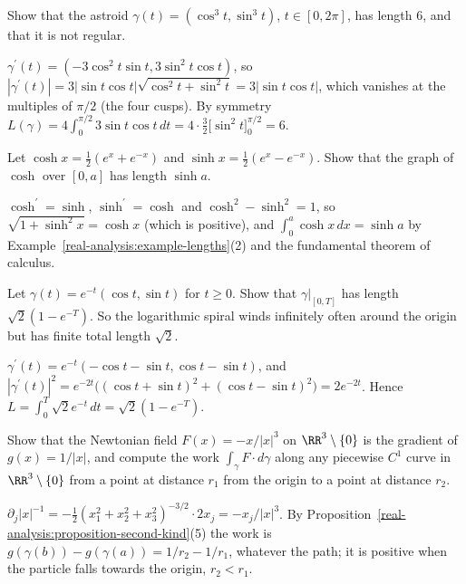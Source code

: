 \begin{exercise}\label{real-analysis:exercise-astroid}
Show that the astroid $\gamma(t) = (\cos^3t, \sin^3t)$, $t \in [0, 2\pi]$, has length $6$, and that it is not regular.
\end{exercise}

\begin{solution}
$\gamma^{\prime}(t) = (-3\cos^2t\sin t, 3\sin^2t\cos t)$, so $|\gamma^{\prime}(t)| = 3|\sin t\cos t|\sqrt{\cos^2t + \sin^2t} = 3|\sin t\cos t|$, which vanishes at the multiples of $\pi/2$ (the four cusps). By symmetry
$L(\gamma) = 4\int_0^{\pi/2}3\sin t\cos t\,dt = 4 \cdot \frac32\bigl[\sin^2t\bigr]_0^{\pi/2} = 6$.
\end{solution}

\begin{exercise}\label{real-analysis:exercise-catenary}
Let $\cosh x = \frac12(e^x + e^{-x})$ and $\sinh x = \frac12(e^x - e^{-x})$. Show that the graph of $\cosh$ over $[0, a]$ has length $\sinh a$.
\end{exercise}

\begin{solution}
$\cosh^{\prime} = \sinh$, $\sinh^{\prime} = \cosh$ and $\cosh^2 - \sinh^2 = 1$, so $\sqrt{1 + \sinh^2x} = \cosh x$ (which is positive), and $\int_0^a\cosh x\,dx = \sinh a$ by
Example~\ref{real-analysis:example-lengths}(2) and the fundamental theorem of calculus.
\end{solution}

\begin{exercise}\label{real-analysis:exercise-log-spiral}
Let $\gamma(t) = e^{-t}(\cos t, \sin t)$ for $t \geq 0$. Show that $\gamma|_{[0, T]}$ has length $\sqrt2(1 - e^{-T})$. So the logarithmic spiral winds infinitely often around the origin but has finite total
length $\sqrt2$.
\end{exercise}

\begin{solution}
$\gamma^{\prime}(t) = e^{-t}(-\cos t - \sin t, \cos t - \sin t)$, and $|\gamma^{\prime}(t)|^2 = e^{-2t}\bigl((\cos t + \sin t)^2 + (\cos t - \sin t)^2\bigr) = 2e^{-2t}$. Hence
$L = \int_0^T\sqrt2e^{-t}\,dt = \sqrt2(1 - e^{-T})$.
\end{solution}

\begin{exercise}\label{real-analysis:exercise-newton-work}
Show that the Newtonian field $F(x) = -x/|x|^3$ on $\RR^3 \setminus \{0\}$ is the gradient of $g(x) = 1/|x|$, and compute the work $\int_\gamma F \cdot d\gamma$ along any piecewise $C^1$ curve in $\RR^3 \setminus \{0\}$
from a point at distance $r_1$ from the origin to a point at distance $r_2$.
\end{exercise}

\begin{solution}
$\partial_j|x|^{-1} = -\frac12(x_1^2 + x_2^2 + x_3^2)^{-3/2} \cdot 2x_j = -x_j/|x|^3$. By Proposition~\ref{real-analysis:proposition-second-kind}(5) the work is $g(\gamma(b)) - g(\gamma(a)) = 1/r_2 - 1/r_1$, whatever
the path; it is positive when the particle falls towards the origin, $r_2 < r_1$.
\end{solution}
